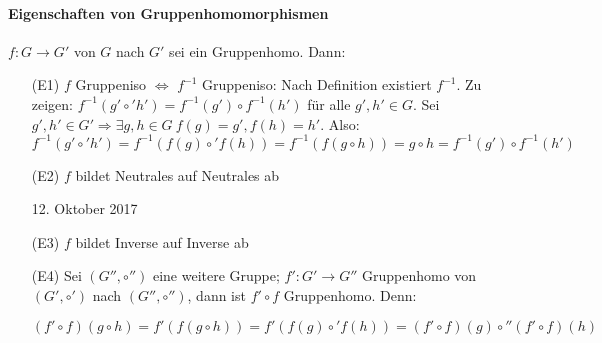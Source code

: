 \documentclass[12pt,a4paper]{article}
\theoremstyle{definition}
\theoremstyle{remark}
\theoremstyle{definition}
\theoremstyle{definition}
\theoremstyle{plain}
\theoremstyle{plain}
\begin{document}
\paragraph{Eigenschaften von Gruppenhomomorphismen} $f\colon G\to G'$ von $G$ nach $G'$ sei ein Gruppenhomo. Dann:
\begin{enumerate}
	\item[(E1)] $f$ Gruppeniso $\Leftrightarrow$ $f^{-1}$ Gruppeniso: Nach Definition existiert $f^{-1}$. Zu zeigen: $f^{-1}(g'\circ' h')= f^{-1}(g')\circ f^{-1}(h')$ für alle $g',h'\in G$. Sei $g', h' \in G' \Rightarrow \exists g, h\in G\ f(g) = g', f(h) = h'$. Also: $f^{-1}(g'\circ'h')= f^{-1}(f(g)\circ'f(h)) = f^{-1}(f(g\circ h))= g\circ h  = f^{-1}(g')\circ f^{-1}(h')$
	\item[(E2)] $f$ bildet Neutrales auf Neutrales ab
	
	\vspace{1 cm}
	
	\hfill 12. Oktober 2017
	\item[(E3)] $f$ bildet Inverse auf Inverse ab
	\item[(E4)] Sei $(G'',\circ'')$ eine weitere Gruppe; $f'\colon G'\to G''$ Gruppenhomo von $(G',\circ')$ nach $(G'',\circ'')$, dann ist $f'\circ f$ Gruppenhomo. Denn: 
	
	$(f'\circ f)(g\circ h) = f'(f(g\circ h)) = f'(f(g)\circ'f(h)) = (f'\circ f)(g)\circ''(f'\circ f)(h)$
\end{enumerate}
\end{document}
